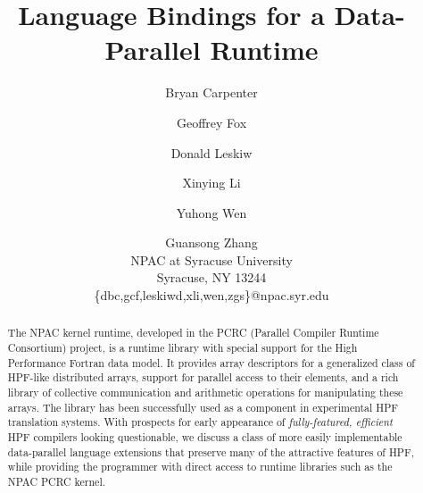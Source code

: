 
%
%
%





\title{Language Bindings for a Data-Parallel Runtime}

\author{Bryan Carpenter
\and
Geoffrey Fox
\and
Donald Leskiw
\and
Xinying Li
\and
Yuhong Wen
\and
Guansong Zhang\\
NPAC at Syracuse University\\ Syracuse, NY 13244 \\
\{dbc,gcf,leskiwd,xli,wen,zgs\}@npac.syr.edu\\
}

\maketitle
\thispagestyle{empty}

\begin{abstract}
The NPAC kernel runtime, developed in the PCRC (Parallel Compiler
Runtime Consortium) project, is a runtime library with special support
for the High Performance Fortran data model.  It provides array
descriptors for a generalized class of HPF-like distributed arrays,
support for parallel access to their elements, and a rich library of
collective communication and arithmetic operations for manipulating these
arrays.  The library has been successfully used as a component in
experimental HPF translation systems.  With prospects for early
appearance of {\em fully-featured, efficient} HPF compilers looking
questionable, we discuss a class of more easily implementable
data-parallel language extensions that preserve many of
the attractive features of HPF, while providing the programmer with
direct access to runtime libraries such as the NPAC PCRC kernel.
\end{abstract}

